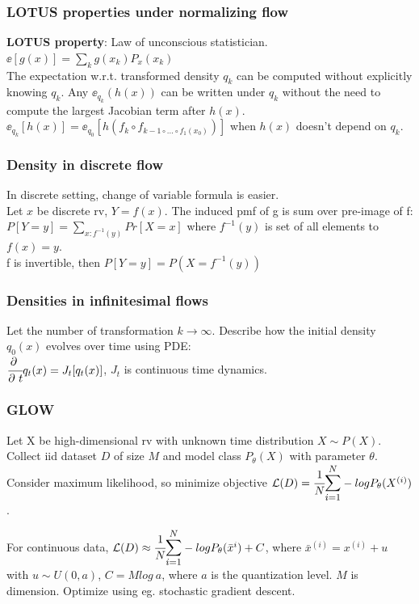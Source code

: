 \documentclass[12pt,a4paper]{article}
\begin{document}
\subsubsection{LOTUS properties under normalizing flow}
\textbf{LOTUS property}: Law of unconscious statistician.\\
$\ee[g(x)]=\sum_k g(x_k)P_x(x_k)$\\
The expectation w.r.t. transformed density $q_k$ can be computed without explicitly knowing $q_k$. Any $\ee_{q_k}(h(x))$ can be written under $q_k$ without the need to compute the largest Jacobian term after $h(x)$.\\ 
$\ee_{q_k}[h(x)]=\ee_{q_0}[h(f_k\circ f_{k-1\circ ... \circ f_1(x_0)})]$ when $h(x)$ doesn't depend on $q_k$.

\subsubsection{Density in discrete flow}
In discrete setting, change of variable formula is easier. \\
Let $x$ be discrete rv, $Y=f(x)$. The induced pmf of g is sum over pre-image of f:\\
$P[Y=y]=\sum_{x: f^{-1}(y)}Pr[X=x]$ where $f^{-1}(y)$ is set of all elements to $f(x)=y$. \\
f is invertible, then $P[Y=y]=P(X=f^{-1}(y))$

\subsubsection{Densities in infinitesimal flows}
Let the number of transformation $k\rightarrow \infty$. Describe how the initial density $q_0(x)$ evolves over time using PDE:\\
$\cfrac{\partial\ }{\partial\ t}q_t(x)=J_t[q_t(x)]$, $J_t$ is continuous time dynamics. 

\subsubsection{GLOW}
Let X be high-dimensional rv with unknown time distribution $X\sim P(X)$. Collect iid dataset $D$ of size $M$ and model class $P_\theta(X)$ with parameter $\theta$. 
Consider maximum likelihood, so minimize objective $\lossl(D)=\cfrac{1}{N}\bsum{i=1}{N}-logP_\theta(X^{(i)})$.

For continuous data, 
$\lossl(D)\approx \cfrac{1}{N}\bsum{i=1}{N}-logP_\theta(\bar{x}^{i})+C$, where $\bar{x}^{(i)}=x^{(i)}+u$ with $u\sim U(0,a)$, $C=Mlog\ a$, where $a$ is the quantization level. $M$ is dimension. Optimize using eg. stochastic gradient descent. 
\end{document}
